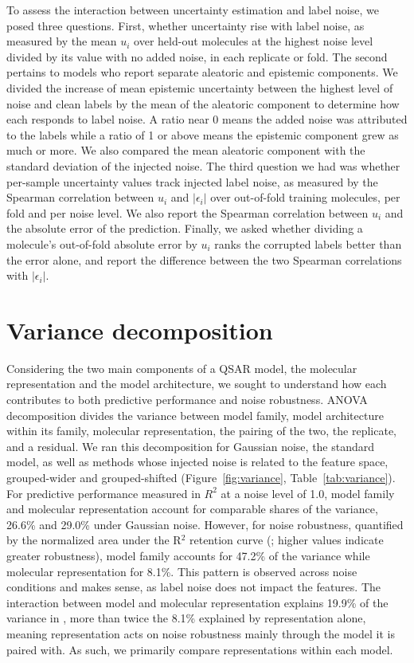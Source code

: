 To assess the interaction between uncertainty estimation and label noise, we posed three questions. First, whether uncertainty rise with label noise, as measured by the mean $u_i$ over held-out molecules at the highest noise level
divided by its value with no added noise, in each replicate or fold. The second pertains to models who report separate aleatoric and epistemic components. We divided the increase of mean epistemic uncertainty between the highest level of noise and clean labels by the mean of the aleatoric component to determine how each responds to label noise. A ratio near 0 means the added noise was attributed to the labels while a ratio of 1 or above means the epistemic component grew as much or more. We also compared the mean aleatoric component with the standard deviation of the injected noise. The third question we had was whether per-sample uncertainty values track injected label noise, as measured by the Spearman correlation between $u_i$ and $|\epsilon_i|$ over out-of-fold training molecules, per fold and per noise level. We also report the Spearman correlation between $u_i$ and the absolute error of the prediction. Finally, we asked whether dividing a molecule's out-of-fold absolute error by $u_i$ ranks the corrupted labels better than the error alone, and report the difference between the two Spearman correlations with $|\epsilon_i|$.


\section{Variance decomposition}

Considering the two main components of a QSAR model, the molecular representation and the model architecture, we sought to understand how each contributes to both predictive performance and noise robustness. ANOVA decomposition divides the variance between model family, model architecture within its family, molecular representation, the pairing of the two, the replicate, and a residual. We ran this decomposition for Gaussian noise, the standard model, as well as methods whose injected noise is related to the feature space, grouped-wider and grouped-shifted (Figure~\ref{fig:variance}, Table~\ref{tab:variance}). For predictive performance measured in $R^2$ at a noise level of 1.0, model family and molecular representation account for comparable shares of the variance, 26.6\% and 29.0\% under Gaussian noise. However, for noise robustness, quantified by the normalized area under the R$^2$ retention curve (\aucnorm; higher values indicate greater robustness), model family accounts for 47.2\% of the variance while molecular representation for 8.1\%. This pattern is observed across noise conditions and makes sense, as label noise does not impact the features. The interaction between model and molecular representation explains 19.9\% of the variance in \aucnorm, more than twice the 8.1\% explained by representation alone, meaning  representation acts on noise robustness mainly through the model it is paired with. As such, we primarily compare representations within each model.

